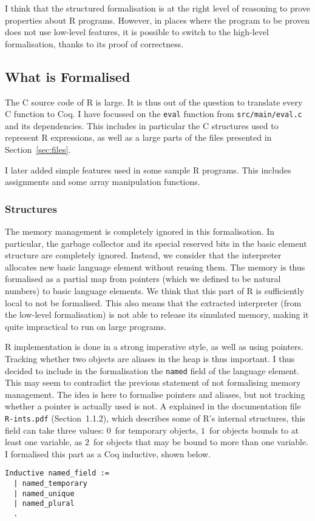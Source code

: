 \documentclass{article}
\newcommand\Coq{Coq}
\newcommand\R{R}
\newcommand\Cn{C}
\begin{document}
I think that the structured formalisation
is at the right level of reasoning to prove properties
about \R{} programs.
However, in places where the program to be proven does
not use low-level features,
it is possible to switch to the high-level formalisation,
thanks to its proof of correctness.


\subsection{What is Formalised}

The \Cn{} source code of \R{} is large.
It is thus out of the question to translate every \Cn{} function to \Coq{}.
I have focussed on the \texttt{eval} function from
\texttt{src/main/eval.c} and its dependencies.
This includes in particular the \Cn{} structures used to represent
\R{} expressions,
as well as a large parts of the files presented in Section~\ref{sec:files}.

I later added simple features used in some sample \R{} programs.
This includes assignments and some array manipulation functions.

\subsubsection{Structures}

The memory management is completely ignored in this formalisation.
In particular, the garbage collector and its special reserved bits in the
basic element structure are completely ignored.
Instead, we consider that the interpreter allocates new basic language element
without reusing them.
The memory is thus formalised as a partial map from pointers
(which we defined to be natural numbers)
to basic language elements.
We think that this part of \R{} is sufficiently local
to not be formalised.
This also means that the extracted interpreter
(from the low-level formalisation)
is not able to release its simulated memory,
making it quite impractical to run on large programs.

\R{} implementation is done in a strong imperative style,
as well as using pointers.
Tracking whether two objects are aliases in the heap is thus important.
I thus decided to include in the formalisation the \texttt{named}
field of the language element.
This may seem to contradict the previous statement of not formalising
memory management.
The idea is here to formalise pointers and aliases,
but not tracking whether a pointer is actually used is not.
%
A explained in the documentation file \texttt{R-ints.pdf}
(Section~1.1.2),
which describes some of \R{}'s internal structures,
this field can take three values:
\(0\)~for temporary objects,
\(1\)~for objects bounds to at least one variable,
as \(2\)~for objects that may be bound to more than one variable.
I formalised this part as a \Coq{} inductive, shown below.
\begin{verbatim}
Inductive named_field :=
  | named_temporary
  | named_unique
  | named_plural
  .
\end{verbatim}
\end{document}
